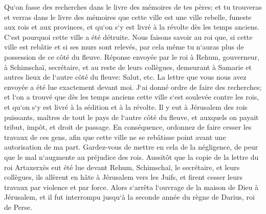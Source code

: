 \verse Qu`on fasse des recherches dans le livre des mémoires de tes pères; et tu trouveras et verras dans le livre des mémoires que cette ville est une ville rebelle, funeste aux rois et aux provinces, et qu`on s`y est livré à la révolte dès les temps anciens. C`est pourquoi cette ville a été détruite. 
\verse Nous faisons savoir au roi que, si cette ville est rebâtie et si ses murs sont relevés, par cela même tu n`auras plus de possession de ce côté du fleuve. 
\verse Réponse envoyée par le roi à Rehum, gouverneur, à Schimschaï, secrétaire, et au reste de leurs collègues, demeurant à Samarie et autres lieux de l`autre côté du fleuve: Salut, etc. 
\verse La lettre que vous nous avez envoyée a été lue exactement devant moi. 
\verse J`ai donné ordre de faire des recherches; et l`on a trouvé que dès les temps anciens cette ville s`est soulevée contre les rois, et qu`on s`y est livré à la sédition et à la révolte. 
\verse Il y eut à Jérusalem des rois puissants, maîtres de tout le pays de l`autre côté du fleuve, et auxquels on payait tribut, impôt, et droit de passage. 
\verse En conséquence, ordonnez de faire cesser les travaux de ces gens, afin que cette ville ne se rebâtisse point avant une autorisation de ma part. 
\verse Gardez-vous de mettre en cela de la négligence, de peur que le mal n`augmente au préjudice des rois. 
\verse Aussitôt que la copie de la lettre du roi Artaxerxès eut été lue devant Rehum, Schimschaï, le secrétaire, et leurs collègues, ils allèrent en hâte à Jérusalem vers les Juifs, et firent cesser leurs travaux par violence et par force. 
\verse Alors s`arrêta l`ouvrage de la maison de Dieu à Jérusalem, et il fut interrompu jusqu`à la seconde année du règne de Darius, roi de Perse. 

